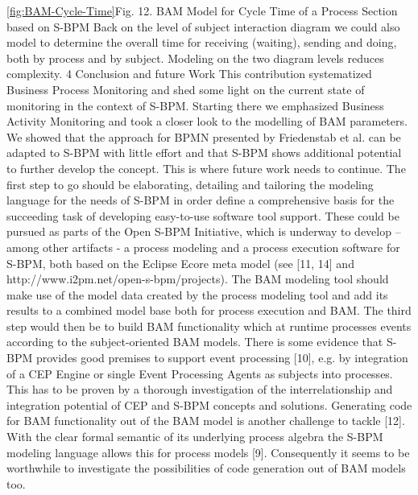 \ref{fig:BAM-Cycle-Time}Fig. 12. BAM Model for Cycle Time of a Process Section based on S-BPM
Back on the level of subject interaction diagram we could also model to determine the overall time for receiving (waiting), sending and doing, both by process and by subject. Modeling on the two diagram levels reduces complexity.
4   Conclusion and future Work
This contribution systematized Business Process Monitoring and shed some light on the current state of monitoring in the context of S-BPM. Starting there we emphasized Business Activity Monitoring and took a closer look to the modelling of BAM parameters. We showed that the approach for BPMN presented by Friedenstab et al. can be adapted to S-BPM with little effort and that S-BPM shows additional potential to further develop the concept.
This is where future work needs to continue. The first step to go should be elaborating, detailing and tailoring the modeling language for the needs of S-BPM in order define a comprehensive basis for the succeeding task of developing easy-to-use software tool support. These could be pursued as parts of the Open S-BPM Initiative, which is underway to develop – among other artifacts - a process modeling and a process execution software for S-BPM, both based on the Eclipse Ecore meta model (see [11, 14] and http://www.i2pm.net/open-s-bpm/projects). The BAM modeling tool should make use of the model data created by the process modeling tool and add its results to a combined model base both for process execution and BAM. The third step would then be to build BAM functionality which at runtime processes events according to the subject-oriented BAM models. There is some evidence that S-BPM provides good premises to support event processing [10], e.g. by integration of a CEP Engine or single Event Processing Agents as subjects into processes. This has to be proven by a thorough investigation of the interrelationship and integration potential of CEP and S-BPM concepts and solutions. Generating code for BAM functionality out of the BAM model is another challenge to tackle [12]. With the clear formal semantic of its underlying process algebra the S-BPM modeling language allows this for process models [9]. Consequently it seems to be worthwhile to investigate the possibilities of code generation out of BAM models too. 

